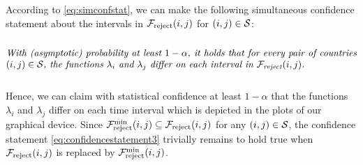 \documentclass[a4paper,12pt]{article}
\numberwithin{equation}{section}
\begin{document}
According to \eqref{eq:simconfstat}, we can make the following simultaneous confidence statement about the intervals in $\mathcal{F}_{\text{reject}}(i,j)$ for $(i,j) \in \mathcal{S}$: 
\begin{equation}\label{eq:confidencestatement3}
\begin{minipage}[c][1.75cm][c]{13cm}
\textit{With (asymptotic) probability at least $1-\alpha$, it holds that for every pair of countries $(i,j) \in \pairs$, the functions $\lambda_i$ and $\lambda_j$ differ on each interval in $\intervals_{\text{reject}}(i,j)$.} 
\end{minipage}
\end{equation}
Hence, we can claim with statistical confidence at least $1-\alpha$ that the functions $\lambda_i$ and $\lambda_j$ differ on each time interval which is depicted in the plots of our graphical device. Since $\mathcal{F}_{\text{reject}}^{\text{min}}(i,j) \subseteq \mathcal{F}_{\text{reject}}(i,j)$ for any $(i,j) \in \mathcal{S}$, the confidence statement \eqref{eq:confidencestatement3} trivially remains to hold true when {\color{red} $\mathcal{F}_{\text{reject}}(i,j)$ is replaced by $\mathcal{F}_{\text{reject}}^{\text{min}}(i,j)$}.
\end{document}
